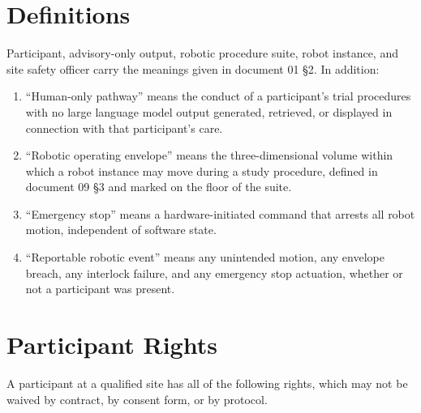 \section{Definitions}

Participant, advisory-only output, robotic procedure suite, robot instance, and
site safety officer carry the meanings given in document 01 §2. In addition:

\begin{enumerate}
\item ``Human-only pathway'' means the conduct of a participant's trial
  procedures with no large language model output generated, retrieved, or
  displayed in connection with that participant's care.

\item ``Robotic operating envelope'' means the three-dimensional volume within
  which a robot instance may move during a study procedure, defined in document
  09 §3 and marked on the floor of the suite.

\item ``Emergency stop'' means a hardware-initiated command that arrests all
  robot motion, independent of software state.

\item ``Reportable robotic event'' means any unintended motion, any envelope
  breach, any interlock failure, and any emergency stop actuation, whether or
  not a participant was present.
\end{enumerate}

\section{Participant Rights}

A participant at a qualified site has all of the following rights, which may not
be waived by contract, by consent form, or by protocol.

